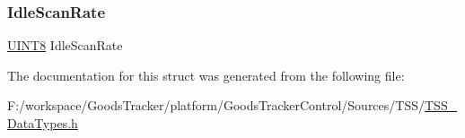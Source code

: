 \subsubsection{\texorpdfstring{Idle\+Scan\+Rate}{IdleScanRate}}
{\footnotesize\ttfamily \hyperlink{_t_s_s___data_types_8h_ab27e9918b538ce9d8ca692479b375b6a}{U\+I\+N\+T8} Idle\+Scan\+Rate}



The documentation for this struct was generated from the following file\+:\begin{DoxyCompactItemize}
\item 
F\+:/workspace/\+Goods\+Tracker/platform/\+Goods\+Tracker\+Control/\+Sources/\+T\+S\+S/\hyperlink{_t_s_s___data_types_8h}{T\+S\+S\+\_\+\+Data\+Types.\+h}\end{DoxyCompactItemize}
